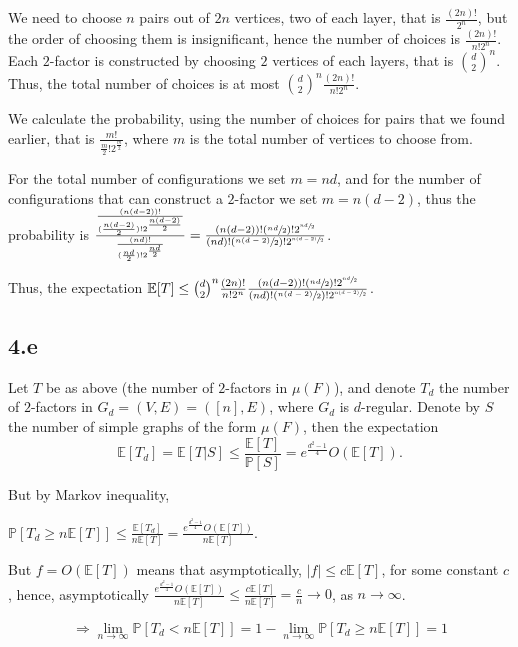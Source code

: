 \documentclass{article}
\begin{document}
We need to choose $n$ pairs out of $2n$ vertices, two of each layer, that is $\frac{(2n)!}{2^n}$, but the order of choosing them is insignificant, hence the number of choices is $\frac{(2n)!}{n!2^n}$.
Each $2$-factor is constructed by choosing $2$ vertices of each layers, that is $\binom{d}{2}^n$. Thus, the total number of choices is at most $\binom{d}{2}^n\frac{(2n)!}{n!2^n}$.

We calculate the probability, using the number of choices for pairs that we found earlier, that is $\frac{m!}{\frac{m}{2}!2^{\frac{m}{2}}}$, where $m$ is the total number of vertices to choose from.

For the total number of configurations we set $m=nd$, and for the number of configurations that can construct a $2$-factor we set $m=n(d-2)$, thus the probability is $
\frac{\frac{(n(d-2))!}{(\frac{n(d-2)}{2})!2^{\frac{n(d-2)}{2}}}}{\frac{(nd)!}{(\frac{nd}{2})!2^{\frac{nd}{2}}}}=\frac{(n(d-2))!(\sfrac{nd}{2})!2^{\sfrac{nd}{2}}}{(nd)!(\sfrac{n(d-2)}{2})!2^{\sfrac{n(d-2)}{2}}}$.

Thus, the expectation $\mathbb{E}[T]\leq\binom{d}{2}^n\frac{(2n)!}{n!2^n}\frac{(n(d-2))!(\sfrac{nd}{2})!2^{\sfrac{nd}{2}}}{(nd)!(\sfrac{n(d-2)}{2})!2^{\sfrac{n(d-2)}{2}}}$.

\subsection*{4.e}
Let $T$ be as above (the number of $2$-factors in $\mu(F)$), and denote $T_d$ the number of $2$-factors in $G_d=(V,E)=([n],E)$, where $G_d$ is $d$-regular. Denote by $S$ the number of simple graphs of the form $\mu(F)$, then the expectation 
\[\mathbb{E}[T_d]=\mathbb{E}[T|S]\leq\frac{\mathbb{E}[T]}{\mathbb{P}[S]}=e^{\frac{d^2-1}{4}}O(\mathbb{E}[T]).\]

But by Markov inequality,

$\mathbb{P}[T_d\geq{n\mathbb{E}[T]}]\leq\frac{\mathbb{E}[T_d]}{n\mathbb{E}[T]}=\frac{e^{\frac{d^2-1}{4}}O(\mathbb{E}[T])}{n\mathbb{E}[T]}$.

But $f=O(\mathbb{E}[T])$ means that asymptotically, $|f|\leq{c\mathbb{E}[T]}$, for some constant $c$, hence, asymptotically $\frac{e^{\frac{d^2-1}{4}}O(\mathbb{E}[T])}{n\mathbb{E}[T]}\leq\frac{c\mathbb{E}[T]}{n\mathbb{E}[T]}=\frac{c}{n}\rightarrow{0}$, as $n\rightarrow\infty$.

\[
\Rightarrow\lim_{n\rightarrow\infty}\mathbb{P}[T_d<n\mathbb{E}[T]]=1-\lim_{n\rightarrow\infty}\mathbb{P}[T_d\geq{n\mathbb{E}[T]}]=1
\]
\end{document}
